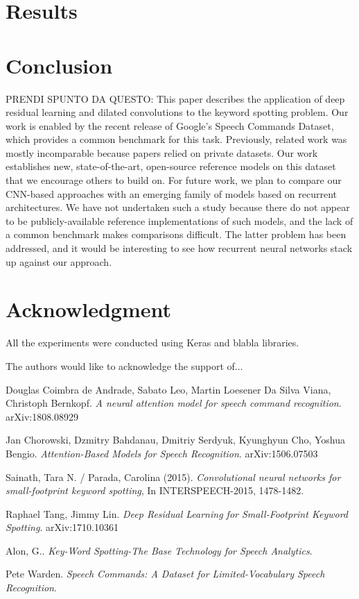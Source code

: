 \documentclass[conference]{IEEEtran}
\begin{document}
\section{Results}
\section{Conclusion}
PRENDI SPUNTO DA QUESTO: This paper describes the application of deep residual learning and dilated convolutions to the keyword spotting problem. Our work is enabled by the recent release of Google’s Speech Commands Dataset, which provides a common benchmark for this task. Previously, related work was mostly incomparable because papers relied on private datasets. Our work establishes new, state-of-the-art, open-source reference models on this dataset that we encourage others to build on. For future work, we plan to compare our CNN-based approaches with an emerging family of models based on recurrent architectures. We have not undertaken such a study because there do not appear to be publicly-available reference implementations of such models, and the lack of a common benchmark makes comparisons difficult. The latter problem has been addressed, and it would be interesting to see how
recurrent neural networks stack up against our approach.

\section*{Acknowledgment}
All the experiments were conducted using Keras and blabla libraries.

The authors would like to acknowledge the support of...


\begin{thebibliography}{1}
Douglas Coimbra de Andrade, Sabato Leo, Martin Loesener Da Silva Viana, Christoph Bernkopf. \textit{A neural attention model for speech command recognition}. arXiv:1808.08929

Jan Chorowski, Dzmitry Bahdanau, Dmitriy Serdyuk, Kyunghyun Cho, Yoshua Bengio. \textit{Attention-Based Models for Speech Recognition}. arXiv:1506.07503

Sainath, Tara N. / Parada, Carolina (2015). \textit{Convolutional neural networks for small-footprint keyword spotting}, In INTERSPEECH-2015, 1478-1482.

Raphael Tang, Jimmy Lin. \textit{Deep Residual Learning for Small-Footprint Keyword Spotting}. arXiv:1710.10361

Alon, G.. \textit{Key-Word Spotting-The Base Technology for Speech Analytics}.

Pete Warden. \textit{Speech Commands: A Dataset for Limited-Vocabulary Speech Recognition}.
\end{thebibliography}
\end{document}
